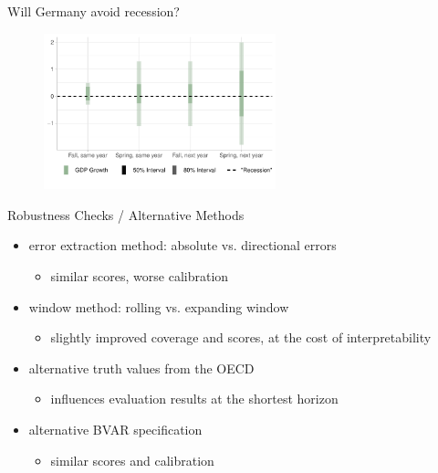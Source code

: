 \documentclass[en]{sdqbeamer}
\begin{document}
\addtocounter{framenumber}{-1}
\begin{frame}{Will Germany avoid recession?}
\begin{figure}
        \centering
        \includegraphics[width=0.6\textwidth]{figures/horizon_uncc_germany2023_current.pdf}
        \label{fig:enter-label}
    \end{figure}


\end{frame}


\begin{frame}{Robustness Checks / Alternative Methods}
\begin{itemize}
    \item error extraction method: absolute vs. directional errors
    \begin{itemize}
    \item similar scores, worse calibration \hyperlink{errorextraction}{}
    \end{itemize}
    \item window method: rolling vs. expanding window
    \begin{itemize}
    \item slightly improved coverage and scores, at the cost of interpretability \hyperlink{extractionmethod}{}
    \end{itemize}

    \item alternative truth values from the OECD
    \begin{itemize}
    \item influences evaluation results at the shortest horizon \hyperlink{alternativetruth}{}
    \end{itemize}
    \item alternative BVAR specification
    \begin{itemize}
    \item similar scores and calibration \hyperlink{alternativebvar}{}
    \end{itemize}
\end{itemize}
\end{frame}
\end{document}
